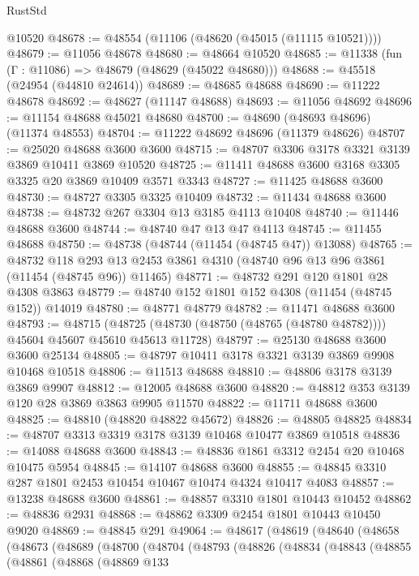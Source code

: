 \begin{lexlean}{RustStd}
\begin{coremodule}
    @10520
@48678 := @48554 (@11106 (@48620 (@45015 (@11115 @10521))))
@48679 := @11056 @48678
@48680 := @48664 @10520
@48685 := @11338 (fun (Γ : @11086) => @48679 (@48629 (@45022 @48680)))
@48688 := @45518 (@24954 (@44810 @24614))
@48689 := @48685 @48688
@48690 := @11222 @48678
@48692 := @48627 (@11147 @48688)
@48693 := @11056 @48692
@48696 := @11154 @48688 @45021 @48680
@48700 := @48690 (@48693 @48696) (@11374 @48553)
@48704 := @11222 @48692 @48696 (@11379 @48626)
@48707 := @25020 @48688 @3600 @3600
@48715 := @48707 @3306 @3178 @3321 @3139 @3869 @10411 @3869 @10520
@48725 := @11411 @48688 @3600 @3168 @3305 @3325 @20 @3869 @10409 @3571 @3343
@48727 := @11425 @48688 @3600
@48730 := @48727 @3305 @3325 @10409
@48732 := @11434 @48688 @3600
@48738 := @48732 @267 @3304 @13 @3185 @4113 @10408
@48740 := @11446 @48688 @3600
@48744 := @48740 @47 @13 @47 @4113
@48745 := @11455 @48688
@48750 := @48738 (@48744 (@11454 (@48745 @47)) @13088)
@48765 := @48732
    @118
    @293
    @13
    @2453
    @3861
    @4310
    (@48740 @96 @13 @96 @3861 (@11454 (@48745 @96)) @11465)
@48771 := @48732 @291 @120 @1801 @28 @4308 @3863
@48779 := @48740 @152 @1801 @152 @4308 (@11454 (@48745 @152)) @14019
@48780 := @48771 @48779
@48782 := @11471 @48688 @3600
@48793 := @48715
    (@48725 (@48730 (@48750 (@48765 (@48780 @48782)))) @45604 @45607 @45610 @45613 @11728)
@48797 := @25130 @48688 @3600 @3600 @25134
@48805 := @48797 @10411 @3178 @3321 @3139 @3869 @9908 @10468 @10518
@48806 := @11513 @48688
@48810 := @48806 @3178 @3139 @3869 @9907
@48812 := @12005 @48688 @3600
@48820 := @48812 @353 @3139 @120 @28 @3869 @3863 @9905 @11570
@48822 := @11711 @48688 @3600
@48825 := @48810 (@48820 @48822 @45672)
@48826 := @48805 @48825
@48834 := @48707 @3313 @3319 @3178 @3139 @10468 @10477 @3869 @10518
@48836 := @14088 @48688 @3600
@48843 := @48836 @1861 @3312 @2454 @20 @10468 @10475 @5954
@48845 := @14107 @48688 @3600
@48855 := @48845 @3310 @287 @1801 @2453 @10454 @10467 @10474 @4324 @10417 @4083
@48857 := @13238 @48688 @3600
@48861 := @48857 @3310 @1801 @10443 @10452
@48862 := @48836 @2931
@48868 := @48862 @3309 @2454 @1801 @10443 @10450 @9020
@48869 := @48845 @291
@49064 := @48617
    (@48619
      (@48640
        (@48658
          (@48673
            (@48689
              (@48700
                (@48704
                  (@48793
                    (@48826
                      (@48834
                        (@48843
                          (@48855
                            (@48861
                              (@48868
                                (@48869
                                  @133

\end{coremodule}
\end{lexlean}
